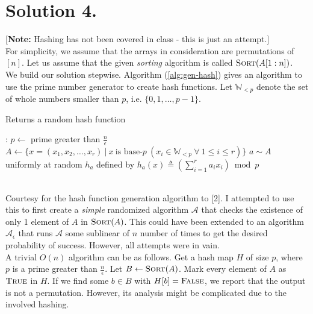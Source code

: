 \documentclass[9pt]{article}
\begin{document}
\section*{\textbf{Solution 4.}}
[\textbf{Note:} Hashing has not been covered in class - this is just an attempt.] \\
For simplicity, we assume that the arrays in consideration are permutations of $[n]$. Let us assume
that the given \textit{sorting} algorithm is called $\textsc{Sort}(A[1:n])$. \\
We build our solution stepwise. Algorithm (\ref{alg:gen-hash}) gives an algorithm to use the prime number
generator to create hash functions. Let $\mathbb{W}_{<p}$ denote the set of whole numbers smaller than
$p$, i.e. $\{ 0, 1, \dots, p-1 \}$.
\begin{algorithm}
    \caption{Returns a random hash function}
    \label{alg:gen-hash}
    \begin{algorithmic}[1]
        :
            \State $p \gets$ prime greater than $\frac{n}{\epsilon}$
            \State $A \gets \{ x = (x_{1}, x_{2}, \dots, x_{r}) \ | \ x \ \text{is base-}p \ (x_{i} \in \mathbb{W}_{<p} \ \forall \ 1 \leq i \leq r) \}$
            \State $a \sim A$ uniformly at random
            \State \Return $h_{a}$ defined by $h_{a}(x) \triangleq \left( \sum_{i=1}^{r} a_{i} x_{i} \right) \bmod p$ 
        \EndProcedure
    \end{algorithmic}
\end{algorithm}
\vspace*{0pt} \\
Courtesy for the hash function generation algorithm to [2]. I attempted to use this to first create
a \textit{simple} randomized algorithm $\mathcal{A}$ that checks the existence of only 1 element of $A$ in $\textsc{Sort}(A)$.
This could have been extended to an algorithm $\mathcal{A}_{\epsilon}$ that runs $\mathcal{A}$ some
sublinear of $n$ number of times to get the desired probability of success. However, all attempts were
in vain. \\
A trivial $O(n)$ algorithm can be as follows. Get a hash map $H$ of size $p$, where $p$ is a prime greater than $\frac{n}{\epsilon}$.
Let $B \gets \textsc{Sort}(A)$. Mark every element of $A$ as $\textsc{True}$ in $H$. If we find some $b \in B$ with $H[b] = \textsc{False}$,
we report that the output is not a permutation. However, its analysis might be complicated due to the involved hashing.
\end{document}

